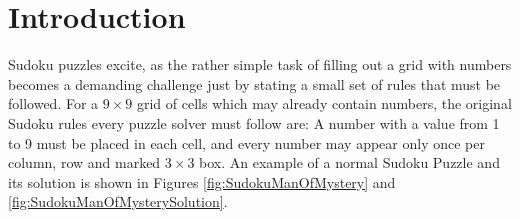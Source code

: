 \chapter{Introduction}

Sudoku puzzles excite, as the rather simple task of filling out a grid with numbers becomes a demanding challenge just by stating a small set of rules that must be followed. For a $9 \times 9$ grid of cells which may already contain numbers, the original Sudoku rules every puzzle solver must follow are: A number with a value from 1 to 9 must be placed in each cell, and every number may appear only once per column, row and marked $3\times3$ box. An example of a normal Sudoku Puzzle and its solution is shown in Figures \ref{fig:SudokuManOfMystery} and \ref{fig:SudokuManOfMysterySolution}.

